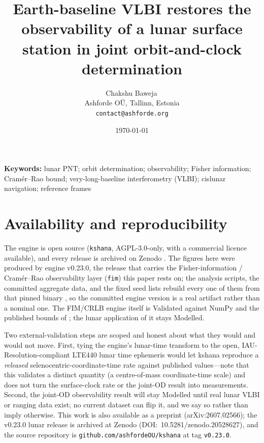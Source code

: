 \documentclass[11pt]{article}
\title{\textbf{Earth-baseline VLBI restores the observability of a lunar
surface station in joint orbit-and-clock determination}}
\author{Chakshu Baweja\,\orcidlink{0009-0008-2098-0751}\\
\small Ashforde O\"U, Tallinn, Estonia \\
\small \texttt{contact@ashforde.org}}
\date{\today}
\newcommand{\code}[1]{\texttt{#1}}
\begin{document}
\linenumbers
\maketitle

\begin{abstract}

\end{abstract}

\noindent\textbf{Keywords:} lunar PNT; orbit determination; observability;
Fisher information; Cram\'er--Rao bound; very-long-baseline interferometry (VLBI);
cislunar navigation; reference frames











\section{Availability and reproducibility}

The engine is open source (\code{kshana}, AGPL-3.0-only, with a commercial
licence available), and every release is archived on Zenodo
\citep{baweja2026kshana}. The figures here were produced by engine v0.23.0, the
release that carries the Fisher-information / Cram\'er--Rao observability layer
(\code{fim}) this paper rests on; the analysis scripts, the committed aggregate
data, and the fixed seed lists rebuild every one of them from that pinned binary
\citep{fernandezprades2018reproducibility}, so the committed engine version is a
real artifact rather than a nominal one. The FIM/CRLB engine itself is Validated
against NumPy and the published bounds of \citet{kay1993}; the lunar application
of it stays Modelled.

Two external-validation steps are scoped and honest about what they would and
would not move. First, tying the engine's lunar-time transform to the open,
IAU-Resolution-compliant LTE440 lunar time ephemeris would let kshana reproduce a
\emph{released} selenocentric-coordinate-time rate against published values---note
that this validates a distinct quantity (a centre-of-mass coordinate-time scale)
and does not turn the surface-clock rate or the joint-OD result into measurements.
Second, the joint-OD observability result will stay Modelled until real lunar VLBI
or ranging data exist; no current dataset can flip it, and we say so rather than
imply otherwise. This work is also available as a preprint (arXiv:2607.02566); the
v0.23.0 lunar release is archived at Zenodo (DOI:~10.5281/zenodo.20528627), and the
source repository is \code{github.com/ashfordeOU/kshana} at tag \code{v0.23.0}.
\end{document}
